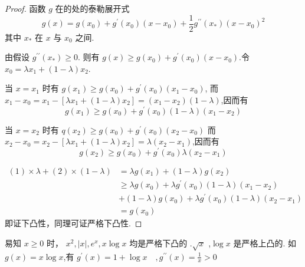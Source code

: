 \begin{proof}
    函数 $ g $ 在的处的泰勒展开式
$$
g(x)=g\left(x_{0}\right)+g^{\prime}\left(x_{0}\right)\left(x - x_{0}\right)+\frac{1}{2} g^{\prime \prime}\left(x_{*}\right)\left(x-x_{0}\right)^{2}
$$
其中 $ x_*$ 在 $ x $ 与 $ x_{0} $ 之间.

由假设 $ g^{\prime \prime}\left(x_{*}\right) \geqslant 0 $. 则有 $ g(x) \geqslant g\left(x_{0}\right)+g^{\prime}\left(x_{0}\right)\left(x-x_{0}\right) $.令 $ x_{0}=\lambda x_{1}+(1-\lambda) x_{2} $.

当 $ x=x_{1} $ 时有 $ g\left(x_{1}\right) \geqslant g\left(x_{0}\right)+g^{\prime}\left(x_{0}\right)\left(x_{1}-x_{0}\right) $,
而 $ x_{1}-x_{0}=x_{1}-\left[\lambda x_{1}+(1-\lambda) x_{2}\right] =\left(x_{1}-x_{2}\right)(1-\lambda)$,因而有
\begin{equation*}
    g\left(x_{1}\right) \geqslant g\left(x_{0}\right)+g^{\prime}\left(x_{0}\right)(1-\lambda)\left(x_{1}-x_{2}\right) \tag{1}
\end{equation*}

当 $ x=x_{2} $ 时有 $ q\left(x_{2}\right) \geqslant g\left(x_{0}\right)+g^{\prime}\left(x_{0}\right)\left(x_{2}-x_{0}\right) $
而 $ x_{2}-x_{0}=x_{2}-\left[\lambda x_{1}+(1-\lambda) x_{2}\right] =\lambda\left(x_{2}-x_{1}\right)$,因而有
\begin{equation*}
    g\left(x_{2}\right) \geqslant g\left(x_{0}\right)+g^{\prime}\left(x_{0}\right) \lambda\left(x_{2}-x_{1}\right) \tag{2}
\end{equation*}

$$
\begin{aligned}
(1)\times \lambda+(2) \times(1-\lambda) &=\lambda g\left(x_{1}\right)+(1-\lambda) g\left(x_{2}\right) \\& \geqslant \lambda g\left(x_{0}\right)+\lambda g^{\prime}\left(x_{0}\right)(1-\lambda)\left(x_{1}-x_{2}\right) \\
& +(1-\lambda) g\left(x_{0}\right)+\lambda g^{\prime}\left(x_{0}\right)(1-\lambda)\left(x_{2}-x_{1}\right) \\
& =g\left(x_{0}\right)
\end{aligned}
$$
即证下凸性，同理可证严格下凸性.
\end{proof}
易知 $ x \geqslant 0 $ 时， $ x^{2},|x|, e^{x}, x \log x $ 均是严格下凸的 .$ \sqrt{x} $ ,$ \log x $ 是严格上凸的.
如 $ g(x)=x \log x $,有 $ g^{\prime}(x)=1+\log x \quad ,g^{\prime \prime}(x)=\frac{1}{x}>0 $

